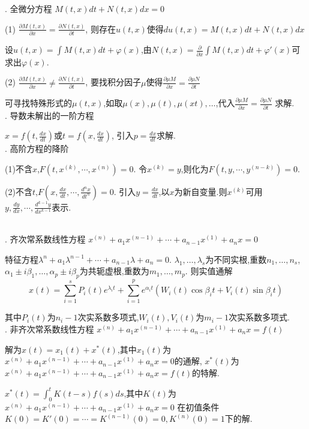 \documentclass[UTF8]{ctexart}
\begin{document}
. 全微分方程 $M(t,x)dt+N(t,x)dx=0$ \par
(1) $\frac{\partial M(t,x)}{\partial x}=\frac{\partial N(t,x)}{\partial t}$, 则存在$u(t,x)$使得$du(t,x)=M(t,x)dt+N(t,x)dx$\par
设$u(t,x)=\int M(t,x)dt+\varphi(x)$,由$N(t,x)=\frac{\partial }{\partial x}\int M(t,x)dt+\varphi'(x)$可求出$\varphi(x)$. \par
(2) $\frac{\partial M(t,x)}{\partial x} \neq \frac{\partial N(t,x)}{\partial t}$,
要找积分因子$\mu$使得$\frac{\partial \mu M}{\partial x}=\frac{\partial \mu N}{\partial t}$ \par
可寻找特殊形式的$\mu(t,x) $,如取$\mu (x),\mu (t),\mu (xt),\dots $,代入$\frac{\partial \mu M}{\partial x}=\frac{\partial \mu N}{\partial t}$ 求解.
~\\


. 导数未解出的一阶方程 \par
$x=f(t,\frac{dx}{dt})$或$t=f(x,\frac{dx}{dt})$,
引入$p=\frac{dx}{dt}$求解.
~\\


. 高阶方程的降阶 \par
(1)不含$x$,$F\left(t, x^{(k)}, \cdots, x^{(n)}\right)=0$.
令$x^{(k)}=y$,则化为$F\left(t, y, \cdots, y^{(n-k)}\right)=0 $.\par
(2)不含$t$,$F\left(x, \frac{d x}{d t}, \cdots, \frac{d^{n} x}{d t^{n}}\right)=0$.
引入$y=\frac{dx}{dt}$,以$x$为新自变量.则$x^{(k)}$可用$y,\frac{dy}{dx},\cdots,\frac{d^{k-1}y}{dx^{k-1}}$表示.\par
~\\

. 齐次常系数线性方程
$x^{(n)}+a_1x^{(n-1)}+\cdots +a_{n-1}x^{(1)}+a_nx=0$ \par
特征方程$\lambda ^{n}+a_1\lambda^{n-1}+\cdots +a_{n-1}\lambda+a_n=0$.
$\lambda_1,\dots ,\lambda_s$为不同实根,重数$n_1,\dots ,n_s$,
$\alpha_1 \pm i\beta_1,\dots ,\alpha_p \pm i\beta_p$为共轭虚根,重数为$m_1,\dots ,m_p$.
则实值通解$$x(t)=\sum_{i=1}^s P_i(t)e^{\lambda_i t} + \sum_{i=1}^p e^{\alpha_i t}(W_i(t)\cos \beta_i t +V_i(t) \sin\beta_i t)$$ \par
其中$P_i(t)$为$n_i-1$次实系数多项式,$W_i(t),V_i(t)$为$m_i-1$次实系数多项式.
~\\

. 非齐次常系数线性方程
$x^{(n)}+a_1x^{(n-1)}+\cdots +a_{n-1}x^{(1)}+a_nx=f(t)$ \par
解为$x(t)=x_1(t)+x^*(t)$,其中$x_1(t)$为$x^{(n)}+a_1x^{(n-1)}+\cdots +a_{n-1}x^{(1)}+a_nx=0$的通解,
$x^*(t)$为$x^{(n)}+a_1x^{(n-1)}+\cdots +a_{n-1}x^{(1)}+a_nx=f(t)$的特解. \par
$x^*(t)=\int _0^t K(t-s)f(s)ds$,其中$K(t)$为$x^{(n)}+a_1x^{(n-1)}+\cdots +a_{n-1}x^{(1)}+a_nx=0$
在初值条件$K(0)=K'(0)=\cdots =K^{(n-1)}(0)=0, K^{(n)}(0)=1$下的解.
~\\
\end{document}

